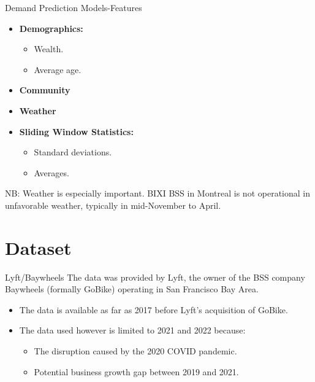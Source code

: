 \documentclass[
  ignorenonframetext,
]{beamer}
\providecommand{\tightlist}{%
  \setlength{\itemsep}{0pt}\setlength{\parskip}{0pt}}
\begin{document}
\begin{frame}{Demand Prediction Models-Features}
\protect\hypertarget{demand-prediction-models-features}{}
\begin{itemize}
\item
  \textbf{Demographics:}

  \begin{itemize}
  \tightlist
  \item
    Wealth.
  \item
    Average age.
  \end{itemize}
\item
  \textbf{Community}
\item
  \textbf{Weather}
\item
  \textbf{Sliding Window Statistics:}

  \begin{itemize}
  \tightlist
  \item
    Standard deviations.
  \item
    Averages.
  \end{itemize}
\end{itemize}

NB: Weather is especially important. BIXI BSS in Montreal is not
operational in unfavorable weather, typically in mid-November to April.
\end{frame}

\hypertarget{dataset}{%
\section{Dataset}\label{dataset}}

\begin{frame}{Lyft/Baywheels}
\protect\hypertarget{lyftbaywheels}{}
The data was provided by Lyft, the owner of the BSS company Baywheels
(formally GoBike) operating in San Francisco Bay Area.

\begin{itemize}
\tightlist
\item
  The data is available as far as 2017 before Lyft's acquisition of
  GoBike.
\item
  The data used however is limited to 2021 and 2022 because:

  \begin{itemize}
  \tightlist
  \item
    The disruption caused by the 2020 COVID pandemic.
  \item
    Potential business growth gap between 2019 and 2021.
  \end{itemize}
\end{itemize}
\end{frame}
\end{document}
